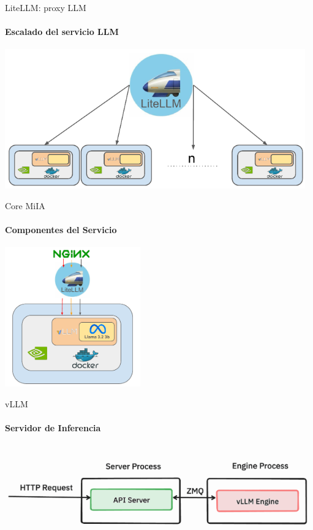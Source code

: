 \documentclass[aspectratio=169]{beamer}
\begin{document}
\begin{frame}{LiteLLM: proxy LLM}
    \framesubtitle{Escalado del servicio LLM}

    \begin{center}
        \includegraphics[height=6cm]{imagenes/LiteLLM_scaling.pdf}
    \end{center}

\end{frame}

\begin{frame}{Core MiIA}
    \framesubtitle{Componentes del Servicio}

    \begin{center}
        \includegraphics[height=6cm]{imagenes/MiIA_core.pdf}
    \end{center}

\end{frame}

\begin{frame}{vLLM}
    \framesubtitle{Servidor de Inferencia}

    \begin{center}
        \includegraphics[height=4cm]{imagenes/vllm_arch.png}
    \end{center}

\end{frame}
\end{document}
